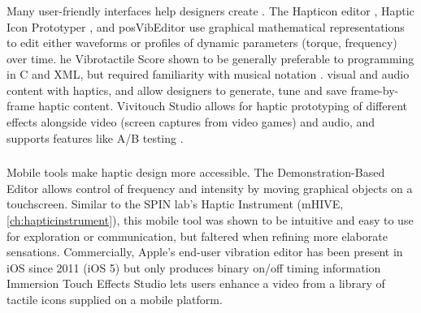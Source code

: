 \subsubsection{}
Many user-friendly interfaces help designers create .
The Hapticon editor \cite{Enriquez2003}, Haptic Icon Prototyper \cite{Swindells2006}, and posVibEditor \cite{Ryu2008} use graphical mathematical representations to edit either waveforms or profiles of dynamic parameters (torque, frequency) over time.
he Vibrotactile Score \cite{Lee2009} shown to be generally preferable to programming in C and XML, but required familiarity with musical notation \cite{Lee2012}.
 visual and audio content with haptics, and allow designers to generate, tune and save frame-by-frame haptic content. 
Vivitouch Studio allows for haptic prototyping of different effects alongside video (screen captures from video games) and audio, and supports features like A/B testing \cite{Swindells2014}.



\subsubsection{}
Mobile tools make haptic design more accessible.
The Demonstration-Based Editor \cite{Hong2013} allows control of frequency and intensity by moving graphical objects on a touchscreen.
Similar to the SPIN lab's Haptic Instrument (mHIVE, \autoref{ch:hapticinstrument}), this mobile tool was shown to be intuitive and easy to use for exploration or communication, but faltered when refining more elaborate sensations. %
Commercially, Apple's end-user vibration editor has been present in iOS since 2011 (iOS 5) but only produces binary on/off timing information\osE{;}
Immersion Touch Effects Studio lets users enhance a video from a  library of tactile icons supplied on a mobile platform.


